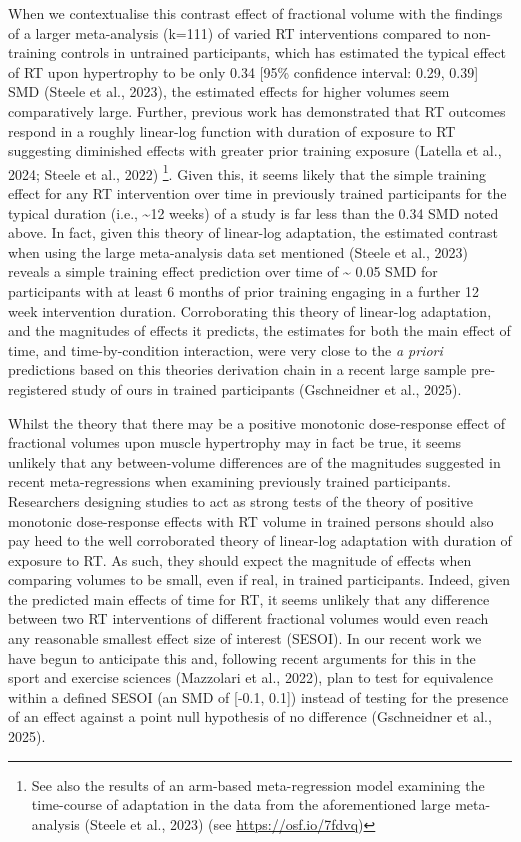 \documentclass[
]{article}
\begin{document}
When we contextualise this contrast effect of fractional volume with the
findings of a larger meta-analysis (k=111) of varied RT interventions
compared to non-training controls in untrained participants, which has
estimated the typical effect of RT upon hypertrophy to be only 0.34
{[}95\% confidence interval: 0.29, 0.39{]} SMD (Steele et al., 2023),
the estimated effects for higher volumes seem comparatively large.
Further, previous work has demonstrated that RT outcomes respond in a
roughly linear-log function with duration of exposure to RT suggesting
diminished effects with greater prior training exposure (Latella et al.,
2024; Steele et al., 2022) \footnote{See also the results of an
  arm-based meta-regression model examining the time-course of
  adaptation in the data from the aforementioned large meta-analysis
  (Steele et al., 2023) (see \url{https://osf.io/7fdvq})}. Given this,
it seems likely that the simple training effect for any RT intervention
over time in previously trained participants for the typical duration
(i.e., \textasciitilde12 weeks) of a study is far less than the 0.34 SMD
noted above. In fact, given this theory of linear-log adaptation, the
estimated contrast when using the large meta-analysis data set mentioned
(Steele et al., 2023) reveals a simple training effect prediction over
time of \textasciitilde{} 0.05 SMD for participants with at least 6
months of prior training engaging in a further 12 week intervention
duration. Corroborating this theory of linear-log adaptation, and the
magnitudes of effects it predicts, the estimates for both the main
effect of time, and time-by-condition interaction, were very close to
the \emph{a priori} predictions based on this theories derivation chain
in a recent large sample pre-registered study of ours in trained
participants (Gschneidner et al., 2025).

Whilst the theory that there may be a positive monotonic dose-response
effect of fractional volumes upon muscle hypertrophy may in fact be
true, it seems unlikely that any between-volume differences are of the
magnitudes suggested in recent meta-regressions when examining
previously trained participants. Researchers designing studies to act as
strong tests of the theory of positive monotonic dose-response effects
with RT volume in trained persons should also pay heed to the well
corroborated theory of linear-log adaptation with duration of exposure
to RT. As such, they should expect the magnitude of effects when
comparing volumes to be small, even if real, in trained participants.
Indeed, given the predicted main effects of time for RT, it seems
unlikely that any difference between two RT interventions of different
fractional volumes would even reach any reasonable smallest effect size
of interest (SESOI). In our recent work we have begun to anticipate this
and, following recent arguments for this in the sport and exercise
sciences (Mazzolari et al., 2022), plan to test for equivalence within a
defined SESOI (an SMD of {[}-0.1, 0.1{]}) instead of testing for the
presence of an effect against a point null hypothesis of no difference
(Gschneidner et al., 2025).
\end{document}
